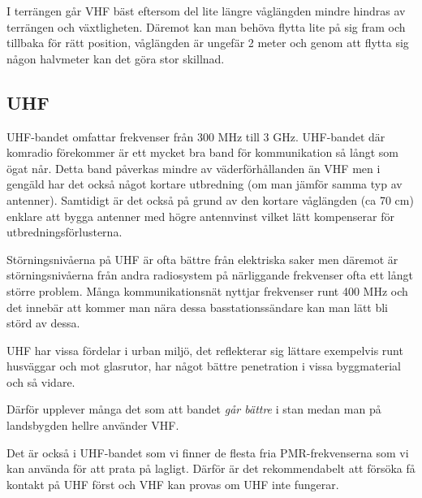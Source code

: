 I terrängen går VHF bäst eftersom del lite längre våglängden mindre hindras av terrängen och växtligheten. Däremot kan man behöva flytta lite på sig fram och tillbaka för rätt position, våglängden är ungefär 2 meter och genom att flytta sig någon halvmeter kan det göra stor skillnad.

\subsection{UHF}

UHF-bandet omfattar frekvenser från 300 MHz till 3 GHz. UHF-bandet där komradio förekommer är ett mycket bra band för kommunikation så långt som ögat når. Detta band påverkas mindre av väderförhållanden än VHF men i gengäld har det också något kortare utbredning (om man jämför samma typ av antenner). Samtidigt är det också på grund av den kortare våglängden (ca 70 cm) enklare att bygga antenner med högre antennvinst vilket lätt kompenserar för utbredningsförlusterna.

Störningsnivåerna på UHF är ofta bättre från elektriska saker men däremot är störningsnivåerna från andra radiosystem på närliggande frekvenser ofta ett långt större problem. Många kommunikationsnät nyttjar frekvenser runt 400 MHz och det innebär att kommer man nära dessa basstationssändare kan man lätt bli störd av dessa.

UHF har vissa fördelar i urban miljö, det reflekterar sig lättare exempelvis runt husväggar och mot glasrutor, har något bättre penetration i vissa byggmaterial och så vidare.

Därför upplever många det som att bandet \textit{går bättre} i stan medan man på landsbygden hellre använder VHF.

Det är också i UHF-bandet som vi finner de flesta fria PMR-frekvenserna som vi kan använda för att prata på lagligt. Därför är det rekommendabelt att försöka få kontakt på UHF först och VHF kan provas om UHF inte fungerar.

